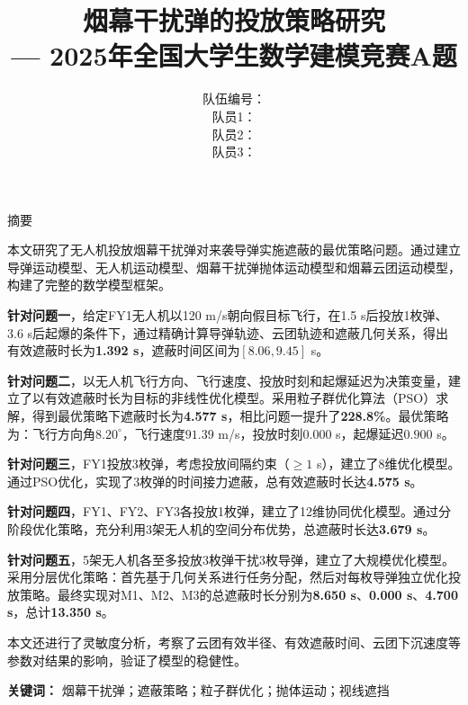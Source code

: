 \documentclass[12pt,a4paper]{article}
\title{
    \vspace{2cm}
    {\heiti\zihao{-1} 烟幕干扰弹的投放策略研究} \\
    \vspace{0.5cm}
    {\zihao{3} --- 2025年全国大学生数学建模竞赛A题}
}
\author{
    \vspace{1cm}
    {\songti\zihao{4} 队伍编号：\underline{\hspace{3cm}}} \\
    \vspace{0.3cm}
    {\songti\zihao{4} 队员1：\underline{\hspace{3cm}}} \\
    {\songti\zihao{4} 队员2：\underline{\hspace{3cm}}} \\
    {\songti\zihao{4} 队员3：\underline{\hspace{3cm}}}
}
\date{}
\begin{document}
\maketitle
\thispagestyle{empty}
\newpage

\thispagestyle{empty}
\begin{center}
    {\heiti{} 摘\quad 要}
\end{center}

\vspace{0.5cm}

本文研究了无人机投放烟幕干扰弹对来袭导弹实施遮蔽的最优策略问题。通过建立导弹运动模型、无人机运动模型、烟幕干扰弹抛体运动模型和烟幕云团运动模型，构建了完整的数学模型框架。

\textbf{针对问题一}，给定FY1无人机以120 m/s朝向假目标飞行，在1.5 s后投放1枚弹、3.6 s后起爆的条件下，通过精确计算导弹轨迹、云团轨迹和遮蔽几何关系，得出有效遮蔽时长为\textbf{1.392 s}，遮蔽时间区间为$[8.06, 9.45]$ s。

\textbf{针对问题二}，以无人机飞行方向、飞行速度、投放时刻和起爆延迟为决策变量，建立了以有效遮蔽时长为目标的非线性优化模型。采用粒子群优化算法（PSO）求解，得到最优策略下遮蔽时长为\textbf{4.577 s}，相比问题一提升了\textbf{228.8\%}。最优策略为：飞行方向角$8.20^\circ$，飞行速度$91.39$ m/s，投放时刻$0.000$ s，起爆延迟$0.900$ s。

\textbf{针对问题三}，FY1投放3枚弹，考虑投放间隔约束（$\geq 1$ s），建立了8维优化模型。通过PSO优化，实现了3枚弹的时间接力遮蔽，总有效遮蔽时长达\textbf{4.575 s}。

\textbf{针对问题四}，FY1、FY2、FY3各投放1枚弹，建立了12维协同优化模型。通过分阶段优化策略，充分利用3架无人机的空间分布优势，总遮蔽时长达\textbf{3.679 s}。

\textbf{针对问题五}，5架无人机各至多投放3枚弹干扰3枚导弹，建立了大规模优化模型。采用分层优化策略：首先基于几何关系进行任务分配，然后对每枚导弹独立优化投放策略。最终实现对M1、M2、M3的总遮蔽时长分别为\textbf{8.650 s}、\textbf{0.000 s}、\textbf{4.700 s}，总计\textbf{13.350 s}。

本文还进行了灵敏度分析，考察了云团有效半径、有效遮蔽时间、云团下沉速度等参数对结果的影响，验证了模型的稳健性。

\vspace{0.5cm}
\noindent\textbf{关键词：} 烟幕干扰弹；遮蔽策略；粒子群优化；抛体运动；视线遮挡

\newpage

\thispagestyle{empty}
\tableofcontents
\newpage
\end{document}

